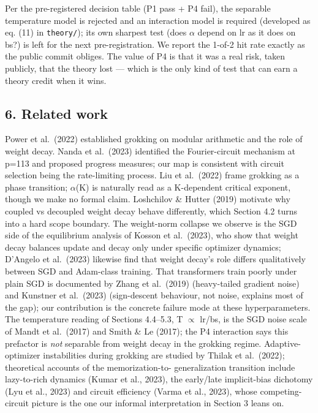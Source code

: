 \documentclass[
  11pt,
]{article}
\begin{document}
Per the pre-registered decision table (P1 pass + P4 fail), the separable
temperature model is rejected and an interaction model is required
(developed as eq. (11) in \texttt{theory/}); its own sharpest test (does
$\alpha$ depend on lr as it does on bs?) is left for the next pre-registration.
We report the 1-of-2 hit rate exactly as the public commit obliges. The
value of P4 is that it was a real risk, taken publicly, that the theory
lost --- which is the only kind of test that can earn a theory credit
when it wins.

\subsection{6. Related work}\label{related-work}

Power et al.~(2022) established grokking on modular arithmetic and the
role of weight decay. Nanda et al.~(2023) identified the Fourier-circuit
mechanism at p=113 and proposed progress measures; our map is consistent
with circuit selection being the rate-limiting process. Liu et
al.~(2022) frame grokking as a phase transition; $\alpha$(K) is naturally read
as a K-dependent critical exponent, though we make no formal claim.
Loshchilov \& Hutter (2019) motivate why coupled vs decoupled weight
decay behave differently, which Section 4.2 turns into a hard scope
boundary. The weight-norm collapse we observe is the SGD side of the
equilibrium analysis of Kosson et al.~(2023), who show that weight decay
balances update and decay only under specific optimizer dynamics;
D'Angelo et al.~(2023) likewise find that weight decay's role differs
qualitatively between SGD and Adam-class training. That transformers
train poorly under plain SGD is documented by Zhang et al.~(2019)
(heavy-tailed gradient noise) and Kunstner et al.~(2023) (sign-descent
behaviour, not noise, explains most of the gap); our contribution is the
concrete failure mode at these hyperparameters. The temperature reading
of Sections 4.4--5.3, T $\propto$ lr/bs, is the SGD noise scale of Mandt et
al.~(2017) and Smith \& Le (2017); the P4 interaction says this
prefactor is \emph{not} separable from weight decay in the grokking
regime. Adaptive-optimizer instabilities during grokking are studied by
Thilak et al.~(2022); theoretical accounts of the memorization-to-
generalization transition include lazy-to-rich dynamics (Kumar et al.,
2023), the early/late implicit-bias dichotomy (Lyu et al., 2023) and
circuit efficiency (Varma et al., 2023), whose competing-circuit picture
is the one our informal interpretation in Section 3 leans on.
\end{document}
